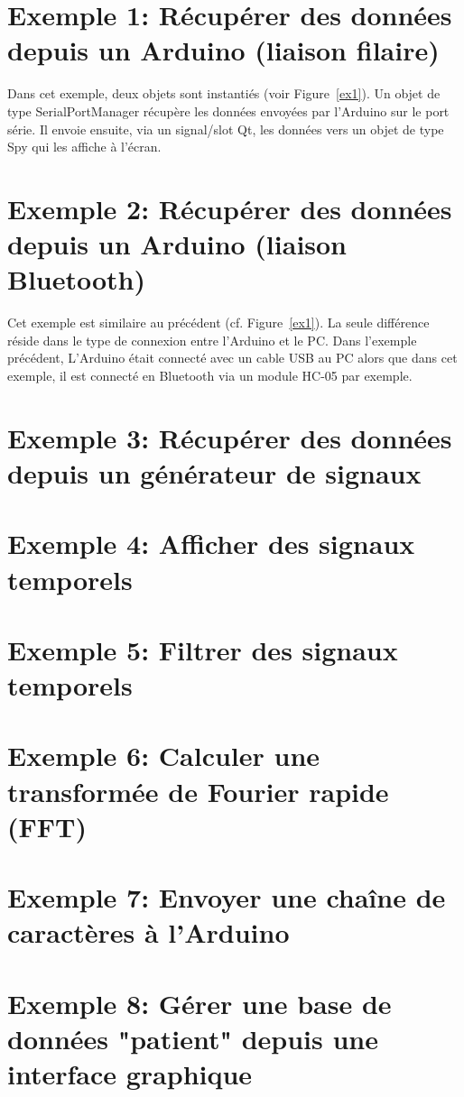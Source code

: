 \documentclass{article}
\begin{document}
\section{Exemple 1: Récupérer des données depuis un Arduino (liaison filaire)}
Dans cet exemple, deux objets sont instantiés (voir Figure~\ref{ex1}). Un objet de type SerialPortManager récupère les données envoyées par l'Arduino sur le port série. 
Il envoie ensuite, via un signal/slot Qt, les données vers un objet de type Spy qui les affiche à l'écran.



\section{Exemple 2: Récupérer des données depuis un Arduino (liaison Bluetooth)}

Cet exemple est similaire au précédent (cf. Figure~\ref{ex1}). La seule différence réside dans le type de connexion entre l'Arduino et le PC. 
Dans l'exemple précédent, L'Arduino était connecté avec un cable USB au PC alors que dans cet exemple, il est connecté en Bluetooth via un module HC-05 par exemple.

\section{Exemple 3: Récupérer des données depuis un générateur de signaux}

\section{Exemple 4: Afficher des signaux temporels}

\section{Exemple 5: Filtrer des signaux temporels}


\section{Exemple 6: Calculer une transformée de Fourier rapide (FFT)}


\section{Exemple 7:  Envoyer une chaîne de caractères à l'Arduino}

\section{Exemple 8:  Gérer une base de données "patient" depuis une interface graphique}
\end{document}
